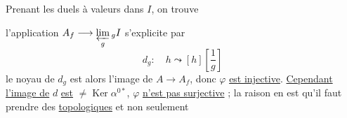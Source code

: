 Prenant les duels à valeurs dans $I$, on trouve


l'application $A_f\longrightarrow\underset{g}{\varprojlim}\,{}_g I$ s'explicite par
\[
d_g:\quad h\leadsto [h]\left[\frac{1}{g}\right]
\]
le noyau de $d_g$ est alors l'image de $A\longrightarrow A_f$, donc $\varphi$ \uline{est injective}. \uline{Cependant l'image de} $d$ \uline{est} $\ne\operatorname{Ker}\alpha^{0\ast}$, $\varphi$ \uline{n'est pas surjective} ; la raison en est qu'il faut prendre des \uline{ topologiques} et non seulement

